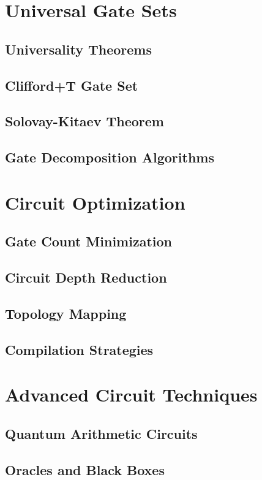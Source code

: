 \documentclass[12pt,a4paper]{book}
\begin{document}
\section{Universal Gate Sets}
\subsection{Universality Theorems}
\subsection{Clifford+T Gate Set}
\subsection{Solovay-Kitaev Theorem}
\subsection{Gate Decomposition Algorithms}

\section{Circuit Optimization}
\subsection{Gate Count Minimization}
\subsection{Circuit Depth Reduction}
\subsection{Topology Mapping}
\subsection{Compilation Strategies}

\section{Advanced Circuit Techniques}
\subsection{Quantum Arithmetic Circuits}
\subsection{Oracles and Black Boxes}
\end{document}
